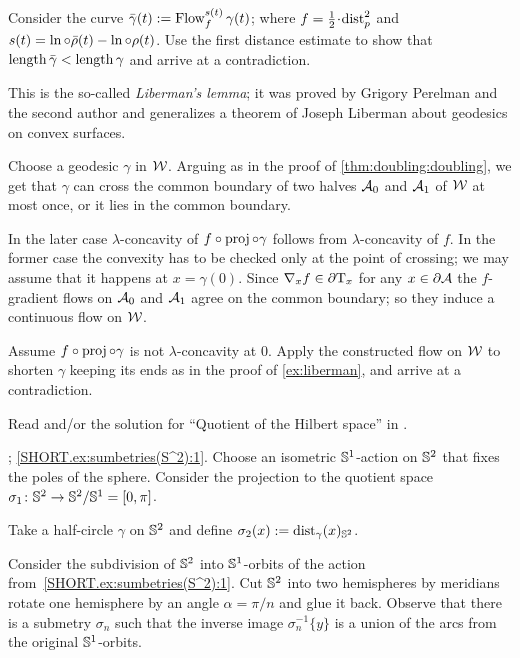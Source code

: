 Consider the curve $\bar\gamma(t)\mathrel{:=} \mathop{\rm Flow}\nolimits_f^{s(t)}\gamma(t)$;
where $f=\tfrac12\cdot\distfun_p^2$ and $s(t)=\ln\circ\bar\rho(t)-\ln\circ\rho(t)$.
Use the first distance estimate to show that $\mathop{\rm length}\nolimits\bar\gamma<\mathop{\rm length}\nolimits\gamma$ and arrive at a contradiction.

This is the so-called \emph{Liberman's lemma};
it was proved by Grigory Perelman and the second author \cite{perelman-petrunin} and generalizes a theorem of Joseph Liberman \cite{liberman} about geodesics on convex surfaces.

Choose a geodesic $\gamma$ in $\mathcal{W}$.
Arguing as in the proof of \ref{thm:doubling:doubling}, we get 
that $\gamma$ can cross the common boundary of two halves $\mathcal{A}_0$ and $\mathcal{A}_1$ of $\mathcal{W}$ at most once, or it lies in the common boundary.

In the later case $\lambda$-concavity of $f\circ\operatorname{\rm proj}\nolimits\circ\gamma$ follows from $\lambda$-concavity of $f$.
In the former case the convexity has to be checked only at the point of crossing;
we may assume that it happens at $x=\gamma(0)$.
Since $\nabla_xf\in\partial\mathrm{T}_x$ for any $x\in\partial\mathcal{A}$ the $f$-gradient flows on $\mathcal{A}_0$ and $\mathcal{A}_1$ agree on the common boundary; so they induce a continuous flow on $\mathcal{W}$.

Assume $f\circ\operatorname{\rm proj}\nolimits\circ\gamma$ is not $\lambda$-concavity at $0$.
Apply the constructed flow on $\mathcal{W}$ to shorten $\gamma$ keeping its ends as in the proof of \ref{ex:liberman},
and arrive at a contradiction.

 Read \cite[Section 4]{terng-thorbergsson} and/or the solution for ``Quotient of the Hilbert space'' in \cite{petrunin2020}.

\parbf{\ref{ex:sumbetries(S^2)}}; \ref{SHORT.ex:sumbetries(S^2):1}.
Choose an isometric $\mathbb{S}^1$-action on $\mathbb{S}^2$ that fixes the poles of the sphere.
Consider the projection to the quotient space $\sigma_1\colon\mathbb{S}^2\to \mathbb{S}^2/\mathbb{S}^1=[0,\pi]$.

Take a half-circle $\gamma$ on $\mathbb{S}^2$ and define 
$\sigma_2(x)\mathrel{:=}\mathrm{dist}_\gamma(x)_{\mathbb{S}^2}$.

Consider the subdivision of $\mathbb{S}^2$ into $\mathbb{S}^1$-orbits of the action from~\ref{SHORT.ex:sumbetries(S^2):1}.
Cut $\mathbb{S}^2$ into two hemispheres by meridians rotate one hemisphere by an angle $\alpha=\pi/n$ and glue it back.
Observe that there is a submetry $\sigma_n$ such that the inverse image $\sigma_n^{-1}\{y\}$ is a union of the arcs from the original $\mathbb{S}^1$-orbits.

